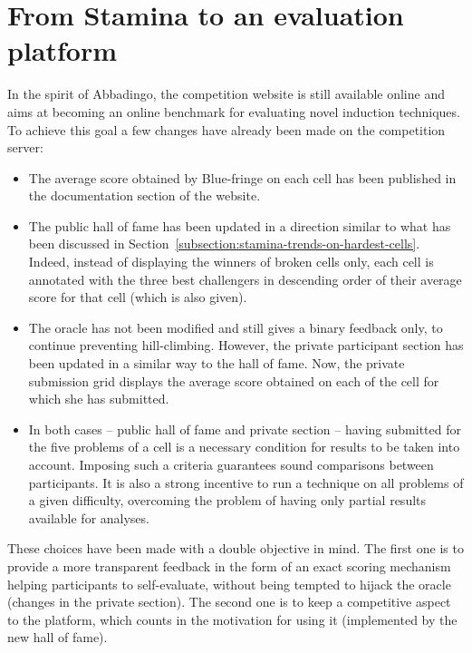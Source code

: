 
\section{From Stamina to an evaluation platform\label{section:stamina-platform}}

In the spirit of Abbadingo, the competition website is still available online and aims at becoming an online benchmark for evaluating novel induction techniques. To achieve this goal a few changes have already been made on the competition server:

\begin{itemize}
\item The average score obtained by Blue-fringe on each cell has been published in the documentation section of the website.
\item The public hall of fame has been updated in a direction similar to what has been discussed in Section~\ref{subsection:stamina-trends-on-hardest-cells}. Indeed, instead of displaying the winners of broken cells only, each cell is annotated with the three best challengers in descending order of their average score for that cell (which is also given). 
\item The oracle has not been modified and still gives a binary feedback only, to continue preventing hill-climbing. However, the private participant section has been updated in a similar way to the hall of fame. Now, the private submission grid displays the average score obtained on each of the cell for which she has submitted.
\item In both cases -- public hall of fame and private section -- having submitted for the five problems of a cell is a necessary condition for results to be taken into account. Imposing such a criteria guarantees sound comparisons between participants. It is also a strong incentive to run a technique on all problems of a given difficulty, overcoming the problem of having only partial results available for analyses.
\end{itemize}

These choices have been made with a double objective in mind. The first one is to provide a more transparent feedback in the form of an exact scoring mechanism helping participants to self-evaluate, without being tempted to hijack the oracle (changes in the private section). The second one is to keep a competitive aspect to the platform, which counts in the motivation for using it (implemented by the new hall of fame). 

